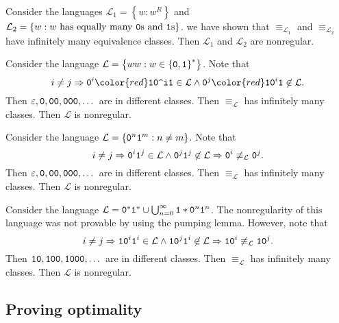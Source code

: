 \documentclass{notes}
\begin{document}
\begin{eg}
  Consider the languages $\mathcal L_1 = \left \{ w : w^R \right \}$ and $\mathcal L_2 = \left \{ w : \text{$w$ has equally many \verb~0~s and \verb~1~s} \right \}$.
  we have shown that $\equiv_{\mathcal L_1}$ and $\equiv_{\mathcal L_2}$ have infinitely many equivalence classes.
  Then $\mathcal L_1$ and $\mathcal L_2$ are nonregular.
\end{eg}

\newpage

\begin{eg}
  Consider the language $\mathcal L = \left \{ ww : w \in \left \{ \verb~0~, \verb~1~ \right \}^* \right \}$.
  Note that 
  \[
    i \neq j \Rightarrow \verb~0~^i {\color{red} \verb~10^i~ \verb~1~} \in \mathcal L \land \verb~0~^j {\color{red} \verb~10~^i \verb~1~} \not \in \mathcal L.
  \]
  Then $\varepsilon, \verb~0~, \verb~00~, \verb~000~, \dots$ are in different classes.
  Then $\equiv_\mathcal L$ has infinitely many classes.
  Then $\mathcal L$ is nonregular.
\end{eg}

\begin{eg}
  Consider the language $\mathcal L = \left \{ \verb~0~^n \verb~1~^m : n \neq m \right \}$.
  Note that 
  \[
    i \neq j \Rightarrow \verb~0~^i \verb~1~^j \in \mathcal L \land \verb~0~^j \verb~1~^j \not \in \mathcal L \Rightarrow \verb~0~^i \not \equiv_\mathcal L \verb~0~^j.
  \]
  Then $\varepsilon, \verb~0~, \verb~00~, \verb~000~, \dots$ are in different classes.
  Then $\equiv_\mathcal L$ has infinitely many classes.
  Then $\mathcal L$ is nonregular.
\end{eg}

\begin{eg}
  Consider the language $\mathcal L = \verb~0~^* \verb~1~^* \cup \bigcup_{n = 0}^\infty \verb~1~* \verb~0~^n \verb~1~^n$.
  The nonregularity of this language was not provable by using the pumping lemma.
  However, note that 
  \[
    i \neq j \Rightarrow \verb~10~^i \verb~1~^i \in \mathcal L \land \verb~10~^j \verb~1~^i \not \in \mathcal L \Rightarrow \verb~10~^i \not \equiv_\mathcal L \verb~10~^j.
  \]
  Then $\verb~10~, \verb~100~, \verb~1000~, \dots$ are in different classes.
  Then $\equiv_\mathcal L$ has infinitely many classes.
  Then $\mathcal L$ is nonregular.
\end{eg}

\subsection{Proving optimality}
\end{document}
